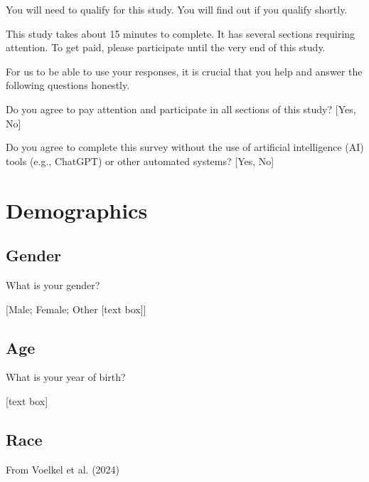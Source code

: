 \documentclass[
  letterpaper,
  DIV=11,
  numbers=noendperiod]{scrartcl}
\begin{document}
You will need to qualify for this study. You will find out if you
qualify shortly.

This study takes about 15 minutes to complete. It has several sections
requiring attention. To get paid, please participate until the very end
of this study.

For us to be able to use your responses, it is crucial that you help and
answer the following questions honestly.

Do you agree to pay attention and participate in all sections of this
study? {[}Yes, No{]}

Do you agree to complete this survey without the use of artificial
intelligence (AI) tools (e.g., ChatGPT) or other automated systems?
{[}Yes, No{]}

\section{Demographics}\label{demographics}

\subsection{Gender}\label{gender}

What is your gender?

{[}Male; Female; Other {[}text box{]}{]}

\subsection{Age}\label{age}

What is your year of birth?

{[}text box{]}

\subsection{Race}\label{race}

\begin{tcolorbox}[enhanced jigsaw, toprule=.15mm, toptitle=1mm, colframe=quarto-callout-note-color-frame, leftrule=.75mm, rightrule=.15mm, bottomtitle=1mm, coltitle=black, colbacktitle=quarto-callout-note-color!10!white, bottomrule=.15mm, breakable, opacityback=0, titlerule=0mm, title=\textcolor{quarto-callout-note-color}{\faInfo}\hspace{0.5em}{Note}, left=2mm, arc=.35mm, opacitybacktitle=0.6, colback=white]

From Voelkel et al. (2024)

\end{tcolorbox}
\end{document}
